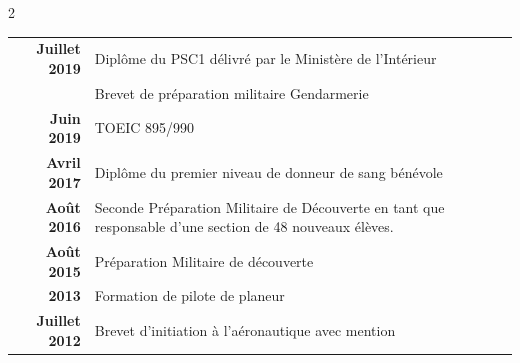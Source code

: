 \documentclass{modernsimplecv}
\newlength{\rightcolwidth}
\begin{document}
\begin{paracol}{2}
\begin{tcolorbox}[boxsep=-1mm, boxrule=0.1mm, boxrule=0mm,colframe=shadecolor,colback=shadecolor]
\begin{minipage}[t]{\rightcolwidth}
\begin{tabular}{>{\footnotesize\bfseries}r >{\footnotesize}p{}}
				Juillet 2019 & Diplôme du PSC1 délivré par le Ministère de l'Intérieur                                                  \\
				             & Brevet de préparation militaire Gendarmerie                                                              \\
				Juin 2019    & TOEIC 895/990                                                                                            \\
				Avril 2017   & Diplôme du premier niveau de donneur de sang bénévole                                                    \\
				Août 2016    & Seconde Préparation Militaire de Découverte en tant que 				responsable d'une section de 48 nouveaux élèves. \\
				Août 2015    & Préparation Militaire de découverte                                                                      \\
				2013         & Formation de pilote de planeur                                                                           \\
				Juillet 2012 & Brevet d'initiation à l'aéronautique avec mention
			
            \end{tabular}
			\vspace{0.5em}
		\end{minipage}

		\begin{minipage}[t]{\rightcolwidth}

\end{minipage}
\end{tcolorbox}
\end{paracol}
\end{document}
